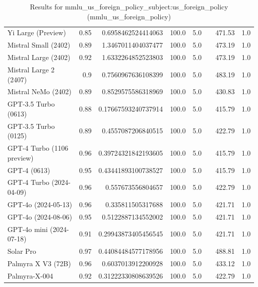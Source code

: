 \begin{table}[htp]
{\begin{tabular}{lrrrrrrr}
Yi Large (Preview) & 0.85 & 0.6958462524414063 & 100.0 & 5.0 &  & 471.53 & 1.0 \\
Mistral Small (2402) & 0.89 & 1.3467011404037477 & 100.0 & 5.0 &  & 473.19 & 1.0 \\
Mistral Large (2402) & 0.92 & 1.6332264852523803 & 100.0 & 5.0 &  & 473.19 & 1.0 \\
Mistral Large 2 (2407) & 0.9 & 0.7560967636108399 & 100.0 & 5.0 &  & 483.19 & 1.0 \\
Mistral NeMo (2402) & 0.89 & 0.8529575586318969 & 100.0 & 5.0 &  & 430.83 & 1.0 \\
GPT-3.5 Turbo (0613) & 0.88 & 0.17667593240737914 & 100.0 & 5.0 &  & 415.79 & 1.0 \\
GPT-3.5 Turbo (0125) & 0.89 & 0.4557087206840515 & 100.0 & 5.0 &  & 422.79 & 1.0 \\
GPT-4 Turbo (1106 preview) & 0.96 & 0.39724321842193605 & 100.0 & 5.0 &  & 415.79 & 1.0 \\
GPT-4 (0613) & 0.95 & 0.43441893100738527 & 100.0 & 5.0 &  & 415.79 & 1.0 \\
GPT-4 Turbo (2024-04-09) & 0.96 & 0.557673556804657 & 100.0 & 5.0 &  & 422.79 & 1.0 \\
GPT-4o (2024-05-13) & 0.96 & 0.335811505317688 & 100.0 & 5.0 &  & 421.71 & 1.0 \\
GPT-4o (2024-08-06) & 0.95 & 0.5122887134552002 & 100.0 & 5.0 &  & 421.71 & 1.0 \\
GPT-4o mini (2024-07-18) & 0.91 & 0.29943873405456545 & 100.0 & 5.0 &  & 421.71 & 1.0 \\
Solar Pro & 0.97 & 0.44084484577178956 & 100.0 & 5.0 &  & 488.81 & 1.0 \\
Palmyra X V3 (72B) & 0.96 & 0.6037013912200928 & 100.0 & 5.0 &  & 433.12 & 1.0 \\
Palmyra-X-004 & 0.92 & 0.31222330808639526 & 100.0 & 5.0 &  & 422.79 & 1.0 \\
\bottomrule
\end{tabular}}
\caption{Results for mmlu_us_foreign_policy_subject:us_foreign_policy (mmlu_us_foreign_policy)}
\label{fig:mmlu_us_foreign_policy_subject:us_foreign_policy (mmlu_us_foreign_policy)}
\end{table}
